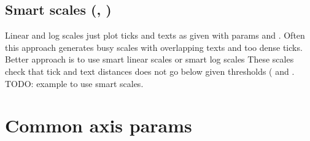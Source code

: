 \documentclass[a4paper,11pt,english]{sphinxmanual}
\let\sphinxpxdimen\pdfpxdimen\else\newdimen\sphinxpxdimen
\begin{document}
\noindent\sphinxincludegraphics[height=600\sphinxpxdimen]{{ex_axes_9}.pdf}


\subsection{Smart scales (, )}
\label{\detokenize{axes/axes:smart-scales-scale-type-smart-linear-scale-type-smart-log}}
Linear and log scales just plot ticks and texts as given with params  and . Often
this approach generates busy scales with overlapping texts and too dense ticks. Better approach is to use smart
linear scales  or smart log scales  These scales check that
tick and text distances does not go below given thresholds ( and  .
TODO: example to use smart scales.


\section{Common axis params}
\label{\detokenize{axes/axes:common-axis-params}}\label{\detokenize{axes/axes:id1}}
\end{document}
